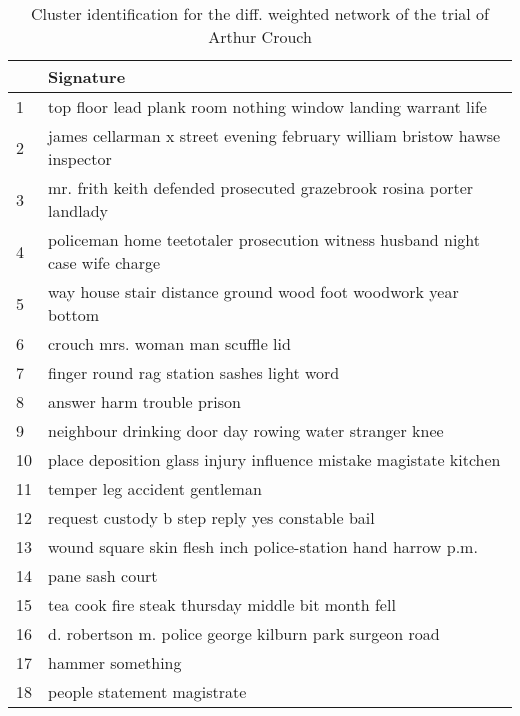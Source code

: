 \begin{table}[ht]
\centering
\begin{tabular}{p{1cm}p{5cm}}
  \hline
 & Signature \\ 
  \hline
1 & top floor lead plank room nothing window landing warrant life \\ 
  2 & james cellarman x street evening february william bristow hawse inspector \\ 
  3 & mr. frith keith defended prosecuted grazebrook rosina porter landlady \\ 
  4 & policeman home teetotaler prosecution witness husband night case wife charge \\ 
  5 & way house stair distance ground wood foot woodwork year bottom \\ 
  6 & crouch mrs. woman man scuffle lid \\ 
  7 & finger round rag station sashes light word \\ 
  8 & answer harm trouble prison \\ 
  9 & neighbour drinking door day rowing water stranger knee \\ 
  10 & place deposition glass injury influence mistake magistate kitchen \\ 
  11 & temper leg accident gentleman \\ 
  12 & request custody b step reply yes constable bail \\ 
  13 & wound square skin flesh inch police-station hand harrow p.m. \\ 
  14 & pane sash court \\ 
  15 & tea cook fire steak thursday middle bit month fell \\ 
  16 & d. robertson m. police george kilburn park surgeon road \\ 
  17 & hammer something \\ 
  18 & people statement magistrate \\ 
   \hline
\end{tabular}
\caption{Cluster identification for the diff. weighted network of the trial of Arthur Crouch} 
\label{c3_crouch_difw_sig}
\end{table}
